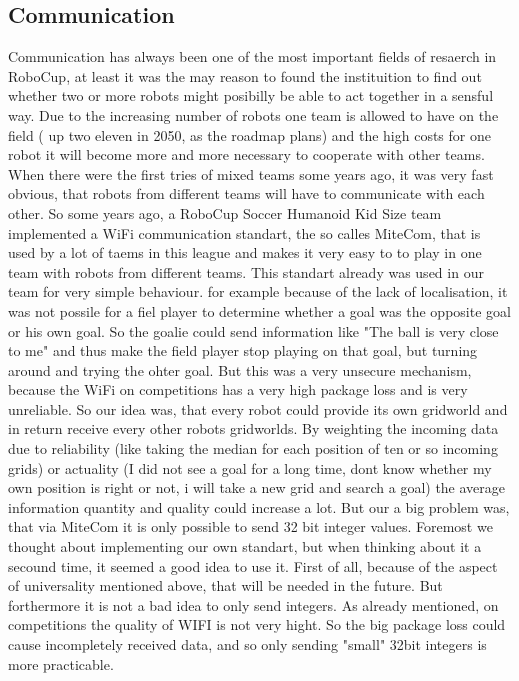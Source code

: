 \documentclass[lnicst,a4paper]{svmultln}
\begin{document}
\subsection{Communication}
Communication has always been one of the most important fields of resaerch in RoboCup, at least it was the may reason to found the instituition to find out whether two or more robots might posibilly be able to act together in a sensful way. 
Due to the increasing number of robots one team is allowed to have on the field ( up two eleven in 2050, as the roadmap plans) and the high costs for one robot it will become more and more necessary to cooperate with other teams. When there were the first tries of mixed teams some years ago, it was very fast obvious, that robots from different teams will have to communicate with each other.
So some years ago, a RoboCup Soccer Humanoid Kid Size team implemented a WiFi communication standart, the so calles MiteCom,  that is used by a lot of taems in this league and makes it very easy to to play in one team with robots from different teams.
This standart already was used in our team for very simple behaviour. for example because of the lack of localisation, it was not possile for a fiel player to determine whether a goal was the opposite goal or his own goal. So the goalie could send information like "The ball is very close to me" and thus make the field player stop playing on that goal, but turning around and trying the ohter goal. But this was a very unsecure mechanism, because the WiFi on competitions has a very high package loss and is very unreliable. 
So our idea was, that every robot could provide its own gridworld and in return receive every other robots gridworlds. By weighting the incoming data due to reliability (like taking the median for each position of ten or so incoming grids) or actuality (I did not see a goal for a long time, dont know whether my own position is right or not, i will take a new grid and search a goal) the average information quantity and quality could increase a lot.
But our a big problem was, that via MiteCom it is only possible to send 32 bit integer values. Foremost we thought about implementing our own standart, but when thinking about it a secound time, it seemed a good idea to use it. First of all, because of the aspect of universality mentioned above, that will be needed in the future. But forthermore it is not a bad idea to only send integers. 
As already mentioned, on competitions the quality of WIFI is not very hight. So the big package loss could cause incompletely received data, and so only sending "small" 32bit integers is more practicable. 
\end{document}
